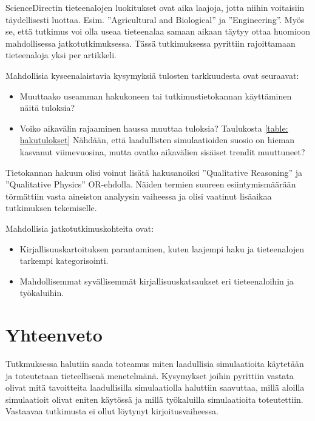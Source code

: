 \documentclass[utf8]{gradu3}
\begin{document}

ScienceDirectin tieteenalojen luokitukset ovat aika laajoja, jotta niihin voitaisiin täydellisesti luottaa. Esim. ''Agricultural and Biological'' ja ''Engineering''. Myös se, että tutkimus voi olla useaa tieteenalaa samaan aikaan täytyy ottaa huomioon mahdollisessa jatkotutkimuksessa. 
Tässä tutkimuksessa pyrittiin rajoittamaan tieteenaloja yksi per artikkeli.

Mahdollisia kyseenalaistavia kysymyksiä tulosten tarkkuudesta ovat seuraavat:
\begin{itemize}
    \item Muuttaako useamman hakukoneen tai tutkimustietokannan käyttäminen näitä tuloksia? 
    \item Voiko aikavälin rajaaminen haussa muuttaa tuloksia? Taulukosta \ref{table: hakutulokset} Nähdään, että laadullisten simulaatioiden suosio on hieman kasvanut
    viimevuosina, mutta ovatko aikavälien sisäiset trendit muuttuneet?
\end{itemize}

Tietokannan hakuun olisi voinut lisätä hakusanoiksi 
''Qualitative Reasoning'' ja ''Qualitative Physics'' OR-ehdolla. 
Näiden termien suureen esiintymismäärään törmättiin vasta aineiston 
analyysin vaiheessa ja olisi vaatinut lisäaikaa tutkimuksen tekemiselle.

Mahdollisia jatkotutkimuskohteita ovat: 
\begin{itemize}
    \item Kirjallisuuskartoituksen parantaminen, kuten laajempi haku ja tieteenalojen tarkempi kategorisointi.
    \item Mahdollisemmat syvällisemmät kirjallisuuskatsaukset eri tieteenaloihin ja työkaluihin.
\end{itemize}

\chapter{Yhteenveto}
Tutkmuksessa halutiin saada toteamus miten laadullisia simulaatioita käytetään
ja toteutetaan tieteellisenä menetelmänä. Kysymykset joihin pyrittiin vastata 
olivat mitä tavoitteita laadullisilla simulaatiolla haluttiin saavuttaa, 
millä aloilla simulaatioit olivat eniten käytössä ja 
millä työkaluilla simulaatioita toteutettiin. Vastaavaa tutkimusta ei ollut 
löytynyt kirjoitusvaiheessa.
\end{document}
